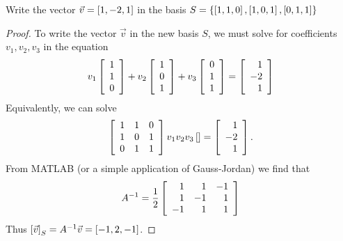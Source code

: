 \documentclass{tutorial}
\begin{document}
\begin{prob}
Write the vector $\vec{v} = \left[ 1,-2,1 \right]$ in the basis $S = \left\{ \left[ 1,1,0 \right], \left[ 1,0,1 \right], \left[ 0,1,1 \right] \right\}$
\end{prob} \ifsolns \begin{proof}
To write the vector $\vec{v}$ in the new basis $S$, we must solve for coefficients $v_1, v_2, v_3$ in the equation
\[
    v_1 \left[ \begin{array}{r} 1 \\ 1 \\ 0 \end{array} \right]
  + v_2 \left[ \begin{array}{r} 1 \\ 0 \\ 1 \end{array} \right]
  + v_3 \left[ \begin{array}{r} 0 \\ 1 \\ 1 \end{array} \right]
  =     \left[ \begin{array}{r} 1 \\-2 \\ 1 \end{array} \right]
\]
Equivalently, we can solve
\[
  \left[ \begin{array}{rrr}
    1 & 1 & 0 \\
    1 & 0 & 1 \\
    0 & 1 & 1
  \end{array} \right]
    v_1 \\ v_2 \\ v_3
  \left[ \begin{array}{r}
  \end{array} \right]
  = \left[ \begin{array}{r}
    1 \\ -2 \\ 1
  \end{array} \right] .
\]
From MATLAB (or a simple application of Gauss-Jordan) we find that
\[
  A^{-1} = \frac{1}{2} \left[ \begin{array}{rrr}
    1 & 1 &-1 \\
    1 &-1 & 1 \\
   -1 & 1 & 1
  \end{array} \right]
\]
Thus $\left[ \vec{v} \right]_S = A^{-1} \vec{v} = \left[ -1,2,-1\right]$.
\end{proof}\else \newpage \fi
\end{document}
